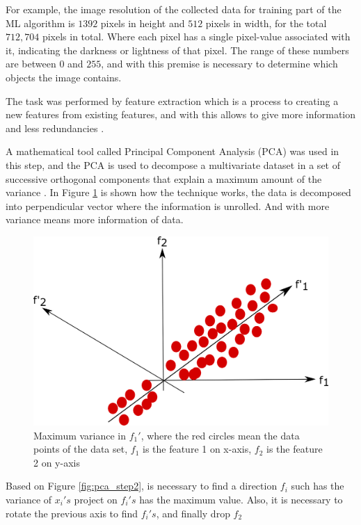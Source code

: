 For example, the image resolution of the collected data for training part of the ML algorithm is $1392$ pixels in height and $512$ pixels in width, for the total $712,704$ pixels in total. Where each pixel has a single pixel-value associated with it, indicating the darkness or lightness of that pixel. The range of these numbers are between $0$ and $255$, and with this premise is necessary to determine which objects the image contains.

The task was performed by feature extraction which is a process to creating a new features from existing features, and with this allows to give more information and less redundancies \cite{wang2019data}.

A mathematical tool called Principal Component Analysis (PCA) was used in this step, and the PCA is used to decompose a multivariate dataset in a set of successive orthogonal components that explain a maximum amount of the variance \cite{pedregosa2011scikit}. In Figure \ref{fig:pca_step1} is shown how the technique works, the data is decomposed into perpendicular vector where the information is unrolled. And with more variance means more information of data.

\begin{figure}[H]
\centering
\includegraphics[scale=0.7]{imagens/pca1.png}
\caption{Maximum variance in $f_1'$, where the red circles mean the data points of the data set, $f_1$ is the feature 1 on x-axis, $f_2$ is the feature 2 on y-axis}
\label{fig:pca_step1}
\end{figure}


Based on Figure \ref{fig:pca_step2}, is necessary to find a direction $f_i$ such has the variance of $x_i's$ project on $f_i's$ has the maximum value. Also, it is necessary to rotate the previous axis to find $f_i's$, and finally drop $f_2$

